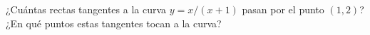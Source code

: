\item ¿Cuántas rectas tangentes a la curva $y = x/(x + 1)$ pasan por el punto $(1, 2)$? ¿En qué puntos estas tangentes tocan a la curva?
